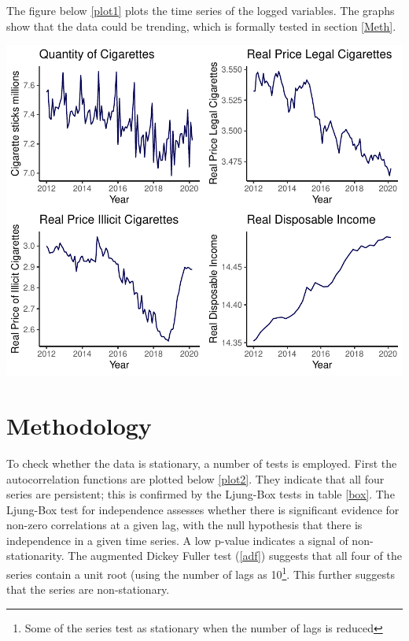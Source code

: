 \documentclass[11pt,preprint, authoryear]{elsarticle}
\let\origfigure\figure
\let\endorigfigure\endfigure
\renewenvironment{figure}[1][2] {
    \expandafter\origfigure\expandafter[H]
} {
    \endorigfigure
}
\numberwithin{equation}{section}
\numberwithin{figure}{section}
\numberwithin{table}{section}
\let\rmarkdownfootnote\footnote%
\def\footnote{\protect\rmarkdownfootnote}
\begin{document}
The figure below \ref{plot1} plots the time series of the logged
variables. The graphs show that the data could be trending, which is
formally tested in section \ref{Meth}.

\begin{figure}

{\centering \includegraphics{Thesis_Draft_files/figure-latex/Figure2-1} 

}

\caption{Time Series Plot \label{plot1}}\label{fig:Figure2}
\end{figure}

\hypertarget{methodology}{%
\section{\texorpdfstring{Methodology
\label{Meth}}{Methodology }}\label{methodology}}

To check whether the data is stationary, a number of tests is employed.
First the autocorrelation functions are plotted below \ref{plot2}. They
indicate that all four series are persistent; this is confirmed by the
Ljung-Box tests in table \ref{box}. The Ljung-Box test for independence
assesses whether there is significant evidence for non-zero correlations
at a given lag, with the null hypothesis that there is independence in a
given time series. A low p-value indicates a signal of non-stationarity.
The augmented Dickey Fuller test (\ref {adf}) suggests that all four of
the series contain a unit root (using the number of lags as
10\footnote{Some of the series test as stationary when the number of
  lags is reduced}. This further suggests that the series are
non-stationary.
\end{document}
